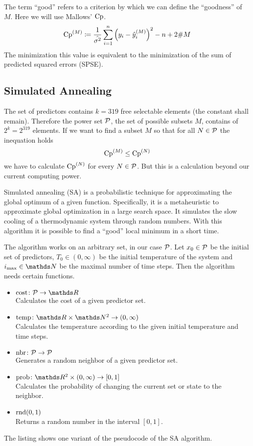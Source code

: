 		The term \enquote{good} refers to a criterion by which we can define the \enquote{goodness} of $M$.
		Here we will use Mallows' $\mathrm{Cp}$.
		\[
			\mathrm{Cp}^{(M)} \coloneqq \frac{1}{\hat{\sigma^2}}\sum_{i=1}^n\left( y_i-\hat{y}^{(M)}_i \right)^2 - n + 2\#M
		\]
		The minimization this value is equivalent to the minimization of the sum of predicted squared errors (SPSE).
	

	\subsection{Simulated Annealing}
	\label{ssec:simulated-annealing}
	
		The set of predictors contains $k=319$ free selectable elements (the constant shall remain).
		Therefore the power set $\mathcal{P}$, the set of possible subsets $M$, contains of $2^{k}=2^{319}$ elements.
		If we want to find a subset $M$ so that for all $N\in\mathcal{P}$ the inequation holds
		\[
			\mathrm{Cp}^{(M)} \leq \mathrm{Cp}^{(N)}
		\]
		we have to calculate $\mathrm{Cp}^{(N)}$ for every $N\in\mathcal{P}$.
		But this is a calculation beyond our current computing power.

		Simulated annealing (SA) is a probabilistic technique for approximating the global optimum of a given function.
		Specifically, it is a metaheuristic to approximate global optimization in a large search space.
		It simulates the slow cooling of a thermodynamic system through random numbers.
		With this algorithm it is possible to find a \enquote{good} local minimum in a short time.

		The algorithm works on an arbitrary set, in our case $\mathcal{P}$.
		Let $x_0\in\mathcal{P}$ be the initial set of predictors, $T_0\in(0,\infty)$ be the initial temperature of the system and $i_\m{max}\in\SN$ be the maximal number of time steps.
		Then the algorithm needs certain functions.
		\begin{itemize}
			\item $\func{\m{cost}}{\s{P}}{\SR}$ \\
				Calculates the cost of a given predictor set.
			\item $\func{\m{temp}}{\SR\times\SN^2}{(0,\infty)}$\\
				Calculates the temperature according to the given initial temperature and time steps.
			\item $\mathrm{nbr}\colon\mathcal{P}\to\mathcal{P}$ \\
				Generates a random neighbor of a given predictor set.
			\item $\func{\m{prob}}{\SR^2\times(0,\infty)}{[0,1]}$ \\
				Calculates the probability of changing the current set or state to the neighbor.
			\item $\mathrm{rnd}(0,1)$ \\
				Returns a random number in the interval $[0,1]$.
		\end{itemize}
		The listing shows one variant of the pseudocode of the SA algorithm. 

